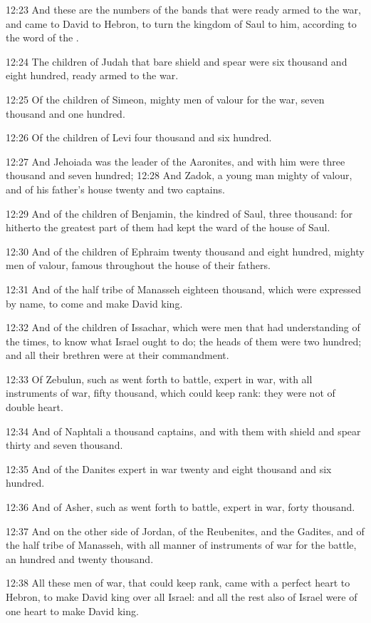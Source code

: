 12:23 And these are the numbers of the bands that were ready armed to
the war, and came to David to Hebron, to turn the kingdom of Saul to
him, according to the word of the \LORD.

12:24 The children of Judah that bare shield and spear were six
thousand and eight hundred, ready armed to the war.

12:25 Of the children of Simeon, mighty men of valour for the war,
seven thousand and one hundred.

12:26 Of the children of Levi four thousand and six hundred.

12:27 And Jehoiada was the leader of the Aaronites, and with him were
three thousand and seven hundred; 12:28 And Zadok, a young man mighty
of valour, and of his father's house twenty and two captains.

12:29 And of the children of Benjamin, the kindred of Saul, three
thousand: for hitherto the greatest part of them had kept the ward of
the house of Saul.

12:30 And of the children of Ephraim twenty thousand and eight
hundred, mighty men of valour, famous throughout the house of their
fathers.

12:31 And of the half tribe of Manasseh eighteen thousand, which were
expressed by name, to come and make David king.

12:32 And of the children of Issachar, which were men that had
understanding of the times, to know what Israel ought to do; the heads
of them were two hundred; and all their brethren were at their
commandment.

12:33 Of Zebulun, such as went forth to battle, expert in war, with
all instruments of war, fifty thousand, which could keep rank: they
were not of double heart.

12:34 And of Naphtali a thousand captains, and with them with shield
and spear thirty and seven thousand.

12:35 And of the Danites expert in war twenty and eight thousand and
six hundred.

12:36 And of Asher, such as went forth to battle, expert in war, forty
thousand.

12:37 And on the other side of Jordan, of the Reubenites, and the
Gadites, and of the half tribe of Manasseh, with all manner of
instruments of war for the battle, an hundred and twenty thousand.

12:38 All these men of war, that could keep rank, came with a perfect
heart to Hebron, to make David king over all Israel: and all the rest
also of Israel were of one heart to make David king.

